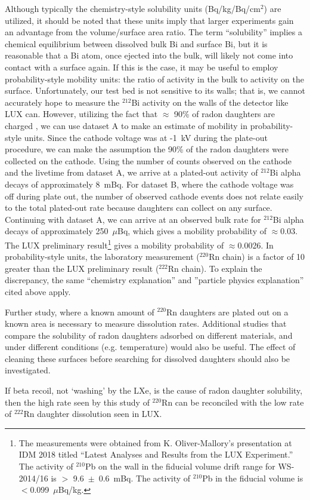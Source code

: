 Although typically the chemistry-style solubility units (Bq/kg/Bq/cm$^{2}$) are utilized, it should be noted that these units imply that larger experiments gain an advantage from the volume/surface area ratio. The term ``solubility'' implies a chemical equilibrium between dissolved bulk Bi and surface Bi, but it is reasonable that a Bi atom, once ejected into the bulk, will likely not come into contact with a surface again. If this is the case, it may be useful to employ probability-style mobility units: the ratio of activity in the bulk to activity on the surface. Unfortunately, our test bed is not sensitive to its walls; that is, we cannot accurately hope to measure the $^{212}$Bi activity on the walls of the detector like \ac{LUX} can. However, utilizing the fact that $\approx$ 90\% of radon daughters are charged \cite{EXOradon}, we can use dataset A to make an estimate of mobility in probability-style units. Since the cathode voltage was at -1~kV during the plate-out procedure, we can make the assumption the 90\% of the radon daughters were collected on the cathode. Using the number of counts observed on the cathode and the livetime from dataset A, we arrive at a plated-out activity of $^{212}$Bi alpha decays of approximately 8~mBq. For dataset B, where the cathode voltage was off during plate out, the number of observed cathode events does not relate easily to the total plated-out rate because daughters can collect on any surface. Continuing with dataset A, we can arrive at an observed bulk rate for $^{212}$Bi alpha decays of approximately 250~$\mu$Bq, which gives a mobility probability of $\approx$0.03. The \ac{LUX} preliminary result\footnote{The measurements were obtained from K. Oliver-Mallory's presentation at IDM 2018 titled ``Latest Analyses and Results from the LUX Experiment.'' The activity of $^{210}$Pb on the wall in the fiducial volume drift range for WS-2014/16 is $>$ 9.6~$\pm$~0.6~mBq. The activity of $^{210}$Pb in the fiducial volume is $<$0.099~$\mu$Bq/kg.} gives a mobility probability of $\approx$0.0026. In probability-style units, the laboratory measurement ($^{220}$Rn chain) is a factor of 10 greater than the \ac{LUX} preliminary result ($^{222}$Rn chain). To explain the discrepancy, the same ``chemistry explanation'' and ''particle physics explanation'' cited above apply.

Further study, where a known amount of $^{220}$Rn daughters are plated out on a known area is necessary to measure dissolution rates. Additional studies that compare the solubility of radon daughters adsorbed on different materials, and under different conditions (e.g. temperature) would also be useful. The effect of cleaning these surfaces before searching for dissolved daughters should also be investigated. 

If beta recoil, not `washing' by the \ac{LXe}, is the cause of radon daughter solubility, then the high rate seen by this study of $^{220}$Rn can be reconciled with the low rate of $^{222}$Rn daughter dissolution seen in \ac{LUX}.


